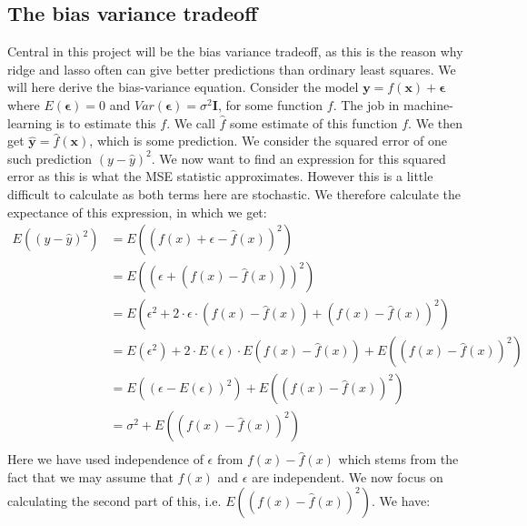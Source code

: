 \documentclass{article}
\begin{document}
\subsection{The bias variance tradeoff}
Central in this project will be the bias variance tradeoff, as this is the reason
why ridge and lasso often can give better predictions than ordinary least
squares. We will here derive the bias-variance equation. Consider the model
$\mathbf{y} = f(\mathbf{x}) + \bm{\epsilon}$ where $E(\bm{\epsilon}) = 0$ and
$Var(\bm{\epsilon}) = \sigma^2 \mathbf{I}$, for some function $f$. The job in machine-learning
is to estimate this $f$. We call $\hat{f}$ some estimate of this function $f$.
We then get $\hat{\mathbf{y}} = \hat{f}(\mathbf{x})$, which is some prediction.
We consider the squared error of one such prediction $(y - \hat{y})^2$. We
now want to find an expression for this squared error as this is what the
MSE statistic approximates. However this is a little difficult to calculate as
both terms here are stochastic. We therefore calculate the expectance of this
expression, in which we get:
\begin{align*}
    E((y - \hat{y})^2) & = E((f(x) + \epsilon - \hat{f}(x))^2)                                                      \\
                       & = E((\epsilon + (f(x) - \hat{f}(x)))^2)                                                    \\
                       & = E(\epsilon^2 + 2\cdot \epsilon \cdot (f(x) - \hat{f}(x)) + (f(x) - \hat{f}(x))^2)        \\
                       & = E(\epsilon^2) + 2\cdot E(\epsilon) \cdot E(f(x) - \hat{f}(x)) + E((f(x) - \hat{f}(x))^2) \\
                       & = E((\epsilon - E(\epsilon))^2) + E((f(x) - \hat{f}(x))^2)                                 \\
                       & = \sigma^2 + E((f(x) - \hat{f}(x))^2)                                                      \\
\end{align*}
Here we have used independence of $\epsilon$ from $f(x) - \hat{f}(x)$ which
stems from the fact that we may assume that $\hat{f}(x)$ and $\epsilon$ are
independent. We now focus on calculating the second part of this, i.e. $E((f(x)
    - \hat{f}(x))^2)$. We have:
\end{document}
